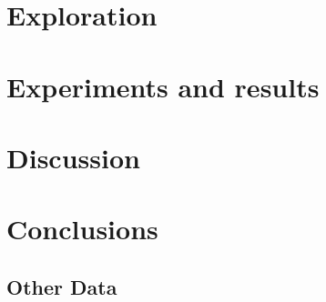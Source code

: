 \documentclass{ba-kecs}
\begin{document}
\section{Exploration}

\section{Experiments and results}
\label{sec:experiments}

	
\section{Discussion}
\label{sec:discussion}

\section{Conclusions}
\label{sec:conclusion}

\newpage


\newpage
\begin{appendices}
\section{Other Data}
	
\end{appendices}
\end{document}
